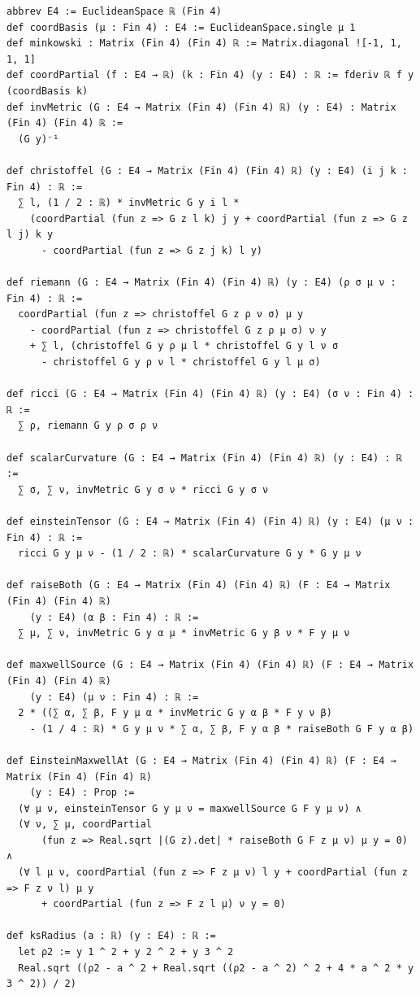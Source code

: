 \documentclass[11pt]{article}
\theoremstyle{definition}
\theoremstyle{remark}
\begin{document}
\begin{lstlisting}
abbrev E4 := EuclideanSpace ℝ (Fin 4)
def coordBasis (μ : Fin 4) : E4 := EuclideanSpace.single μ 1
def minkowski : Matrix (Fin 4) (Fin 4) ℝ := Matrix.diagonal ![-1, 1, 1, 1]
def coordPartial (f : E4 → ℝ) (k : Fin 4) (y : E4) : ℝ := fderiv ℝ f y (coordBasis k)
def invMetric (G : E4 → Matrix (Fin 4) (Fin 4) ℝ) (y : E4) : Matrix (Fin 4) (Fin 4) ℝ :=
  (G y)⁻¹

def christoffel (G : E4 → Matrix (Fin 4) (Fin 4) ℝ) (y : E4) (i j k : Fin 4) : ℝ :=
  ∑ l, (1 / 2 : ℝ) * invMetric G y i l *
    (coordPartial (fun z => G z l k) j y + coordPartial (fun z => G z l j) k y
      - coordPartial (fun z => G z j k) l y)

def riemann (G : E4 → Matrix (Fin 4) (Fin 4) ℝ) (y : E4) (ρ σ μ ν : Fin 4) : ℝ :=
  coordPartial (fun z => christoffel G z ρ ν σ) μ y
    - coordPartial (fun z => christoffel G z ρ μ σ) ν y
    + ∑ l, (christoffel G y ρ μ l * christoffel G y l ν σ
      - christoffel G y ρ ν l * christoffel G y l μ σ)

def ricci (G : E4 → Matrix (Fin 4) (Fin 4) ℝ) (y : E4) (σ ν : Fin 4) : ℝ :=
  ∑ ρ, riemann G y ρ σ ρ ν

def scalarCurvature (G : E4 → Matrix (Fin 4) (Fin 4) ℝ) (y : E4) : ℝ :=
  ∑ σ, ∑ ν, invMetric G y σ ν * ricci G y σ ν

def einsteinTensor (G : E4 → Matrix (Fin 4) (Fin 4) ℝ) (y : E4) (μ ν : Fin 4) : ℝ :=
  ricci G y μ ν - (1 / 2 : ℝ) * scalarCurvature G y * G y μ ν

def raiseBoth (G : E4 → Matrix (Fin 4) (Fin 4) ℝ) (F : E4 → Matrix (Fin 4) (Fin 4) ℝ)
    (y : E4) (α β : Fin 4) : ℝ :=
  ∑ μ, ∑ ν, invMetric G y α μ * invMetric G y β ν * F y μ ν

def maxwellSource (G : E4 → Matrix (Fin 4) (Fin 4) ℝ) (F : E4 → Matrix (Fin 4) (Fin 4) ℝ)
    (y : E4) (μ ν : Fin 4) : ℝ :=
  2 * ((∑ α, ∑ β, F y μ α * invMetric G y α β * F y ν β)
    - (1 / 4 : ℝ) * G y μ ν * ∑ α, ∑ β, F y α β * raiseBoth G F y α β)

def EinsteinMaxwellAt (G : E4 → Matrix (Fin 4) (Fin 4) ℝ) (F : E4 → Matrix (Fin 4) (Fin 4) ℝ)
    (y : E4) : Prop :=
  (∀ μ ν, einsteinTensor G y μ ν = maxwellSource G F y μ ν) ∧
  (∀ ν, ∑ μ, coordPartial
      (fun z => Real.sqrt |(G z).det| * raiseBoth G F z μ ν) μ y = 0) ∧
  (∀ l μ ν, coordPartial (fun z => F z μ ν) l y + coordPartial (fun z => F z ν l) μ y
      + coordPartial (fun z => F z l μ) ν y = 0)

def ksRadius (a : ℝ) (y : E4) : ℝ :=
  let ρ2 := y 1 ^ 2 + y 2 ^ 2 + y 3 ^ 2
  Real.sqrt ((ρ2 - a ^ 2 + Real.sqrt ((ρ2 - a ^ 2) ^ 2 + 4 * a ^ 2 * y 3 ^ 2)) / 2)


\end{lstlisting}
\end{document}
